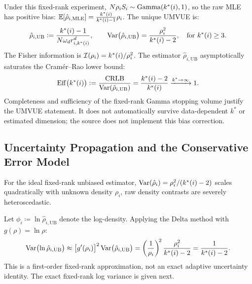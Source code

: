 \begin{proposition}
  \label{prop:umvue_density}
  Under this fixed-rank experiment, $N \rho_i S_i \sim
  \mathrm{Gamma}(k^{*}(i), 1)$, so the raw
  MLE has positive bias: $\mathbb{E}[\hat{\rho}_{i, \mathrm{MLE}}] =
  \frac{k^{*}(i)}{k^{*}(i) - 1} \rho_i$. The unique \ac{UMVUE} is:
  \begin{equation}
    \hat{\rho}_{i, \mathrm{UB}} \mathrel{\mathop:}= \frac{k^{*}(i) - 1}{N \omega_d
    r_{i, k^{*}(i)}^d}, \qquad \operatorname{Var}\bigl(\hat{\rho}_{i,
    \mathrm{UB}}\bigr) = \frac{\rho_i^2}{k^{*}(i) - 2}, \quad
    \text{for } k^{*}(i) \ge 3.
    \label{eq:umvue_density}
  \end{equation}
  The Fisher information is $\mathcal{I}(\rho_i) =
  k^{*}(i)/\rho_i^2$. The estimator $\hat{\rho}_{i, \mathrm{UB}}$
  asymptotically saturates the Cram\'er--Rao lower bound:
  \begin{equation}
    \operatorname{Eff}\bigl(k^{*}(i)\bigr) \mathrel{\mathop:}=
    \frac{\mathrm{CRLB}}{\operatorname{Var}(\hat{\rho}_{i, \mathrm{UB}})} =
    \frac{k^{*}(i) - 2}{k^{*}(i)} \xrightarrow{k^{*} \to \infty} 1.
    \label{eq:asymp_efficiency}
  \end{equation}
  Completeness and sufficiency of the fixed-rank Gamma stopping volume
  justify the UMVUE statement. It does not automatically survive
  data-dependent $k^*$ or estimated dimension; the source does not
  implement this bias correction.
\end{proposition}

\subsection{Uncertainty Propagation and the Conservative Error Model}
\label{subsec:uncertainty_propagation}

For the ideal fixed-rank unbiased estimator,
$\operatorname{Var}(\hat{\rho}_i) = \rho_i^2/(k^{*}(i) - 2)$ scales
quadratically with unknown density $\rho_i$, raw density contrasts
are severely heteroscedastic.

\begin{proposition}
  \label{prop:delta_method_log}
  Let $\phi_i \coloneqq \ln \hat{\rho}_{i, \mathrm{UB}}$ denote the
  log-density. Applying the Delta method \parencite{cramer1946} with
  $g(\rho) = \ln \rho$:
  \begin{equation}
    \operatorname{Var}\bigl(\ln \hat{\rho}_{i, \mathrm{UB}}\bigr) \approx \bigl[
    g'(\rho_i) \bigr]^2 \operatorname{Var}\bigl(\hat{\rho}_{i, \mathrm{UB}}\bigr)
    = \left( \frac{1}{\rho_i} \right)^{\!2}
    \frac{\rho_i^2}{k^{*}(i) - 2} = \frac{1}{k^{*}(i) - 2}.
    \label{eq:delta_method_result}
  \end{equation}
  This is a first-order fixed-rank approximation, not an exact adaptive
  uncertainty identity. The exact fixed-rank log variance is given next.
\end{proposition}


